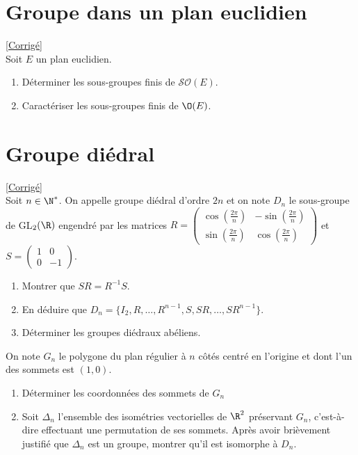 \documentclass[8pt]{book}
\begin{document}
	\section{Groupe dans un plan euclidien }
	\label{Groupe dans un plan euclidien}
	\textcolor{blue}{\hyperref[Groupe dans un plan euclidien corrigé]{[Corrigé]}}\\
	Soit $E$ un plan euclidien.
	\begin{enumerate}[leftmargin=*]
		\item Déterminer les sous-groupes finis de $\mathcal{SO}(E)$.
		\item Caractériser les sous-groupes finis de $\O(E)$.
	\end{enumerate}
	
	\section{Groupe diédral }
	\label{Groupe diédral}
	\textcolor{blue}{\hyperref[Groupe diédral corrigé]{[Corrigé]}}\\
	Soit $n\in \N^*$. On appelle groupe diédral d'ordre $2n$ et on note $D_n$ le sous-groupe de GL$_2(\R)$ engendré par les matrices $R=\begin{pmatrix}
		\cos\left(\frac{2\pi}{n}\right)&-\sin\left(\frac{2\pi}{n}\right)\\
		\sin\left(\frac{2\pi}{n}\right)&\cos\left(\frac{2\pi}{n}\right)
	\end{pmatrix}$ et $S=\begin{pmatrix}
		1&0\\
		0&-1
	\end{pmatrix}$.
	\begin{enumerate}
		\item Montrer que $SR=R^{-1}S$.
		\item En déduire que $D_n=\{I_2,R,\dots,R^{n-1},S,SR,\dots,SR^{n-1}\}$.
		\item Déterminer les groupes diédraux abéliens.
	\end{enumerate}
	On note $G_n$ le polygone du plan régulier à $n$ côtés centré en l'origine et dont l'un des sommets est $(1,0)$.
	\begin{enumerate}[resume]
		\item Déterminer les coordonnées des sommets de $G_n$
		\item Soit $\Delta_n$ l'ensemble des isométries vectorielles de $\R^2$ préservant $G_n$, c'est-à-dire effectuant une permutation de ses sommets. Après avoir brièvement justifié que $\Delta_n$ est un groupe, montrer qu'il est isomorphe à $D_n$.
	\end{enumerate}
	
\end{document}
